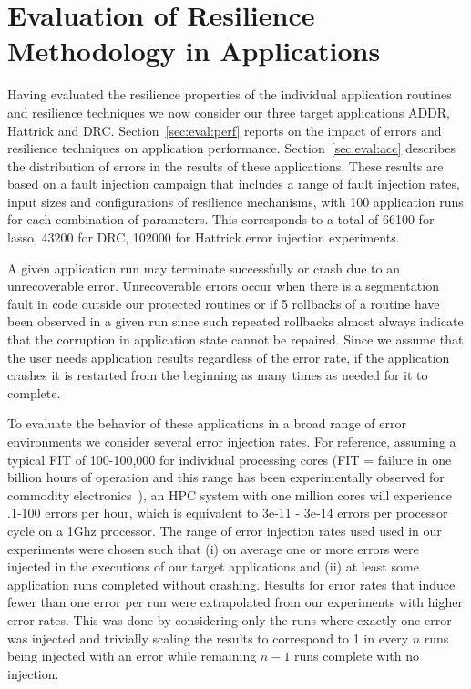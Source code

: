\documentclass{sig-alternate}
\begin{document}
\section{Evaluation of Resilience Methodology in Applications}
\label{sec:eval}

Having evaluated the resilience properties of the individual application routines and resilience techniques we now consider our three target applications ADDR, Hattrick and DRC.
Section~\ref{sec:eval:perf} reports on the impact of errors and resilience techniques on application performance. Section~\ref{sec:eval:acc} describes the distribution of errors in the results of these applications.
These results are based on a fault injection campaign that includes a range of fault injection rates, input sizes and configurations of resilience mechanisms, with 100 application runs for each combination of parameters.
This corresponds to a total of 66100 for lasso, 43200 for DRC, 102000 for Hattrick error injection experiments.

A given application run may terminate successfully or crash due to an unrecoverable error.
Unrecoverable errors occur when there is a segmentation fault in code outside our protected routines or if 5 rollbacks of a routine have been observed in a given run since such repeated rollbacks almost always indicate that the corruption in application state cannot be repaired.
Since we assume that the user needs application results regardless of the error rate, if the application crashes it is restarted from the beginning as many times as needed for it to complete.

To evaluate the behavior of these applications in a broad range of error environments we consider several error injection rates.
For reference, assuming a typical FIT of 100-100,000 for individual processing cores (FIT = failure in one billion hours of operation and this range has been experimentally observed for commodity electronics~\cite{mem_errors:2010}), an HPC system with one million cores will experience .1-100 errors per hour, which is equivalent to 3e-11 - 3e-14 errors per processor cycle on a 1Ghz processor.
The range of error injection rates used used in our experiments were chosen such that (i) on average one or more errors were injected in the executions of our target applications and (ii) at least some application runs completed without crashing.
Results for error rates that induce fewer than one error per run were extrapolated from our experiments with higher error rates.
This was done by considering only the runs where exactly one error was injected and trivially scaling the results to correspond to 1 in every $n$ runs being injected with an error while remaining $n-1$ runs complete with no injection.
\end{document}

